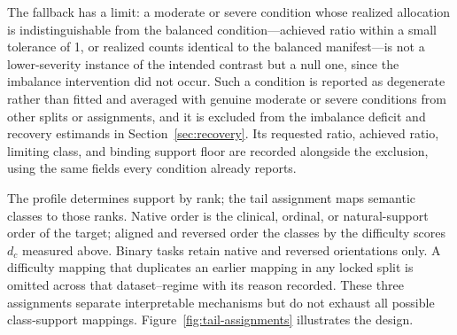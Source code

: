 \documentclass[11pt]{article}
\begin{document}
The fallback has a limit: a moderate or severe condition whose realized allocation is indistinguishable from the balanced condition---achieved ratio within a small tolerance of 1, or realized counts identical to the balanced manifest---is not a lower-severity instance of the intended contrast but a null one, since the imbalance intervention did not occur. Such a condition is reported as degenerate rather than fitted and averaged with genuine moderate or severe conditions from other splits or assignments, and it is excluded from the imbalance deficit and recovery estimands in Section~\ref{sec:recovery}. Its requested ratio, achieved ratio, limiting class, and binding support floor are recorded alongside the exclusion, using the same fields every condition already reports.

The profile determines support by rank; the tail assignment maps semantic classes to those ranks. Native order is the clinical, ordinal, or natural-support order of the target; aligned and reversed order the classes by the difficulty scores $d_c$ measured above. Binary tasks retain native and reversed orientations only. A difficulty mapping that duplicates an earlier mapping in any locked split is omitted across that dataset--regime with its reason recorded. These three assignments separate interpretable mechanisms but do not exhaust all possible class-support mappings. Figure~\ref{fig:tail-assignments} illustrates the design.
\end{document}
